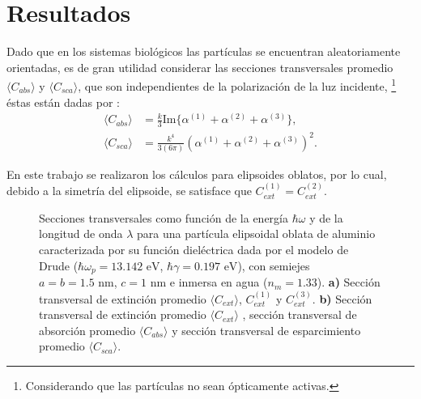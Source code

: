\section{Resultados}
Dado que en los sistemas biológicos las partículas se encuentran aleatoriamente orientadas, es de gran utilidad considerar las secciones transversales promedio $\langle C_{abs}\rangle$ y $\langle C_{sca}\rangle$, que son independientes de la polarización de la luz incidente, \footnote{Considerando que las partículas no sean ópticamente activas.} éstas están dadas por \cite{Bohren}:
\begin{align*}
	\langle C_{abs}\rangle &= \frac{k}{3} \text{Im}\{\alpha^{(1)}+\alpha^{(2)}+\alpha^{(3)}\},\\
	\langle C_{sca}\rangle &= \frac{k^4}{3(6\pi)} \left(\alpha^{(1)}+\alpha^{(2)}+\alpha^{(3)}\right)^2.
\end{align*}

En este trabajo se realizaron los cálculos para elipsoides oblatos, por lo cual, debido a la simetría del elipsoide, se satisface que $C_{ext}^{(1)}=C_{ext}^{(2)}$. 

\begin{figure}[h!]
	\quad%
	\caption{Secciones transversales como función de la energía $\hbar\omega$ y de la longitud de onda $\lambda$ para una partícula elipsoidal oblata de aluminio caracterizada por su función dieléctrica dada por el modelo de Drude ($\hbar\omega_p=13.142\text{ eV}$, $\hbar\gamma=0.197\text{ eV}$), con semiejes $a=b=1.5\text{ nm}$, $c=1\text{ nm}$ e inmersa en agua ($n_m=1.33$). \textbf{a)} Sección transversal de extinción promedio $\langle C_{ext}\rangle$, $C_{ext}^{(1)}$  y $C_{ext}^{(3)}$. \textbf{b)} Sección transversal de extinción promedio $\langle C_{ext}\rangle$ , sección transversal de absorción promedio $\langle C_{abs}\rangle$ y sección transversal de esparcimiento promedio $\langle C_{sca}\rangle$.} \label{fig:test}
\end{figure}

